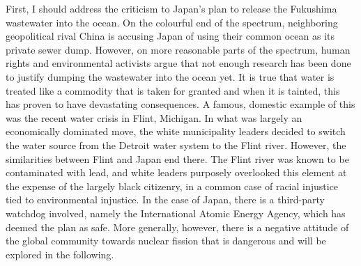 \documentclass[12pt,letterpaper]{article}
\begin{document}
\begin{flushleft}
First, I should address the criticism to Japan's plan to release the Fukushima wastewater into the ocean. On the colourful end of the spectrum, neighboring geopolitical rival China is accusing Japan of using their common ocean as its private sewer dump. However, on more reasonable parts of the spectrum, human rights and environmental activists argue that not enough research has been done to justify dumping the wastewater into the ocean yet. \autocite{noauthor_fukushima_2023} It is true that water is treated like a commodity that is taken for granted and when it is tainted, this has proven to have devastating consequences. A famous, domestic example of this was the recent water crisis in Flint, Michigan. In what was largely an economically dominated move, the white municipality leaders decided to switch the water source from the Detroit water system to the Flint river. However, the similarities between Flint and Japan end there. The Flint river was known to be contaminated with lead, and white leaders purposely overlooked this element at the expense of the largely black citizenry, in a common case of racial injustice tied to environmental injustice. \autocite{fennell_limn_2016} In the case of Japan, there is a third-party watchdog involved, namely the International Atomic Energy Agency, which has deemed the plan as safe. \autocite{noauthor_iaea_2023} More generally, however, there is a negative attitude of the global community towards nuclear fission that is dangerous and will be explored in the following.


\end{flushleft}
\end{document}
